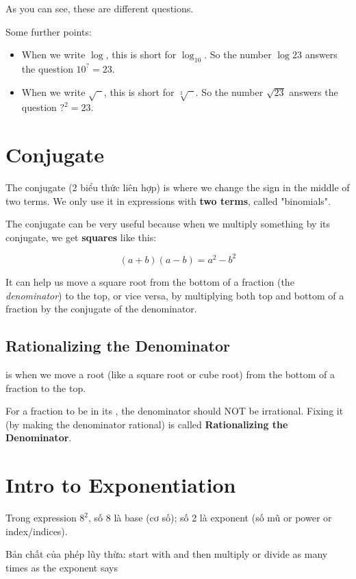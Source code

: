 As you can see, these are different questions.

Some further points:

\begin{itemize}
  \item When we write $\log$, this is short for $\log_{10}$. So the number $\log 23$ answers the question $10^? = 23$.
  \item When we write $\sqrt{\phantom{x}}$, this is short for $\sqrt[2]{\phantom{x}}$. So the number $\sqrt{23}$ answers the question $?^2 = 23$.
\end{itemize}

\section{Conjugate}

The conjugate (2 biểu thức liên hợp) is where we change the sign in the middle of two terms. We only use it in expressions with \textbf{two terms}, called "binomials".

The conjugate can be very useful because when we multiply something by its conjugate, we get \textbf{squares} like this:

\[(a+b)(a-b)=a^{2}-b^{2}\]

It can help us move a square root from the bottom of a fraction (the \textit{denominator}) to the top, or vice versa, by multiplying both top and bottom of a fraction by the conjugate of the denominator.

\subsection{Rationalizing the Denominator}

 is when we move a root (like a square root or cube root) from the bottom of a fraction to the top.

For a fraction to be in its , the denominator should NOT be irrational. Fixing it (by making the denominator rational) is called \textbf{Rationalizing the Denominator}.

\section{Intro to Exponentiation}

Trong expression \(8^{2}\), số 8 là base (cơ số); số 2 là exponent (số mũ or power or index/indices).

Bản chất của phép lũy thừa: start with  and then multiply or divide as many times as the exponent says

